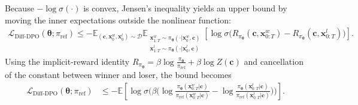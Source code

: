 Because $-\log\sigma(\cdot)$ is convex, Jensen’s inequality yields an upper bound by moving the inner expectations outside the nonlinear function:
\begin{align*}
\mathcal L_{\mathrm{Diff\text{-}DPO}}(\bm\theta;\pi_{\mathrm{ref}})
\le  
-\mathbb E_{(\mathbf c,\mathbf x_0^w,\mathbf x_0^l)\sim\mathcal D}
  \mathbb E_{\substack{\mathbf x^w_{1:T}\sim \pi_{\bm\theta}(\cdot | \mathbf x_0^w,\mathbf c)\\[1pt]
                       \mathbf x^l_{1:T}\sim \pi_{\bm\theta}(\cdot | \mathbf x_0^l,\mathbf c)}}
\left[
\log \sigma \Big(
R_{\pi_{\bm\theta}}(\mathbf c,\mathbf x^w_{0:T})
-
R_{\pi_{\bm\theta}}(\mathbf c,\mathbf x^l_{0:T})
\Big)
\right].
\end{align*}
Using the implicit-reward identity $R_{\pi_{\bm\theta}}=\beta\log\frac{\pi_{\bm\theta}}{\pi_{\mathrm{ref}}}+\beta\log Z(\mathbf c)$ and cancellation of the constant between winner and loser, the bound becomes
\begin{align}\label{eq:dpo-path-bound}
\mathcal L_{\mathrm{Diff\text{-}DPO}}(\bm\theta;\pi_{\mathrm{ref}})
& \le
-\mathbb E
\left[
\log \sigma \Big(
\beta\big(
\log\frac{\pi_{\bm\theta}(\mathbf x^w_{0:T}| \mathbf c)}{\pi_{\mathrm{ref}}(\mathbf x^w_{0:T}| \mathbf c)}
-
\log\frac{\pi_{\bm\theta}(\mathbf x^l_{0:T}| \mathbf c)}{\pi_{\mathrm{ref}}(\mathbf x^l_{0:T}| \mathbf c)}
\big)
\Big)
\right].
\end{align}

